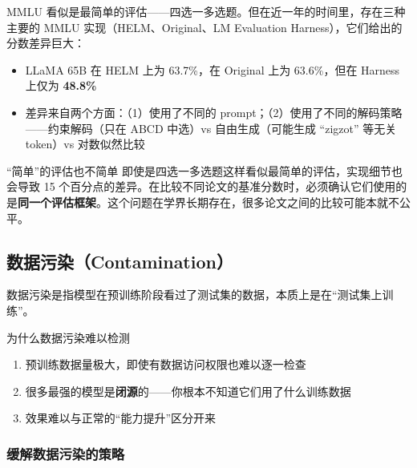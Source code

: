 \documentclass[a4paper]{article}
\begin{document}



MMLU 看似是最简单的评估——四选一多选题。但在近一年的时间里，存在三种主要的 MMLU 实现（HELM、Original、LM Evaluation Harness），它们给出的分数差异巨大：

\begin{itemize}
    \item LLaMA 65B 在 HELM 上为 63.7\%，在 Original 上为 63.6\%，但在 Harness 上仅为 \textbf{48.8\%}
    \item 差异来自两个方面：（1）使用了不同的 prompt；（2）使用了不同的解码策略——约束解码（只在 ABCD 中选）vs 自由生成（可能生成 ``zigzot'' 等无关 token）vs 对数似然比较
\end{itemize}

\begin{warningbox}{``简单''的评估也不简单}
即使是四选一多选题这样看似最简单的评估，实现细节也会导致 15 个百分点的差异。在比较不同论文的基准分数时，必须确认它们使用的是\textbf{同一个评估框架}。这个问题在学界长期存在，很多论文之间的比较可能本就不公平。
\end{warningbox}

\subsection{数据污染（Contamination）}





数据污染是指模型在预训练阶段看过了测试集的数据，本质上是在``测试集上训练''。

\begin{importantbox}{为什么数据污染难以检测}
\begin{enumerate}
    \item 预训练数据量极大，即使有数据访问权限也难以逐一检查
    \item 很多最强的模型是\textbf{闭源}的——你根本不知道它们用了什么训练数据
    \item 效果难以与正常的``能力提升''区分开来
\end{enumerate}
\end{importantbox}





\subsubsection{缓解数据污染的策略}
\end{document}
